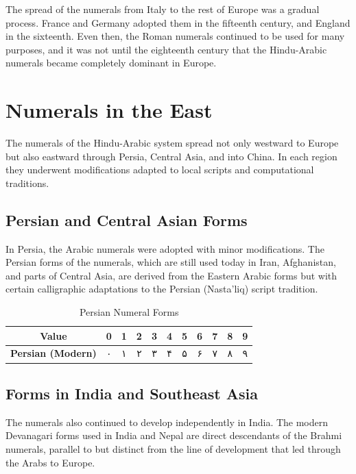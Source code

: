\documentclass[11pt,a4paper]{article}
\newcommand{\ar}[1]{{\arabicfont #1}}
\begin{document}
The spread of the numerals from Italy to the rest of Europe was a gradual process. France and Germany adopted them in the fifteenth century, and England in the sixteenth. Even then, the Roman numerals continued to be used for many purposes, and it was not until the eighteenth century that the Hindu-Arabic numerals became completely dominant in Europe.

\newpage

\section{Numerals in the East}\label{ch:east}

The numerals of the Hindu-Arabic system spread not only westward to Europe but also eastward through Persia, Central Asia, and into China. In each region they underwent modifications adapted to local scripts and computational traditions.

\subsection*{Persian and Central Asian Forms}

In Persia, the Arabic numerals were adopted with minor modifications. The Persian forms of the numerals, which are still used today in Iran, Afghanistan, and parts of Central Asia, are derived from the Eastern Arabic forms but with certain calligraphic adaptations to the Persian (Nasta'liq) script tradition.

\begin{table}[H]
\centering
\caption{Persian Numeral Forms}
\label{tab:persian}
\small
\begin{tabular}{>{\bfseries}c | c c c c c c c c c c}
\toprule
Value & 0 & 1 & 2 & 3 & 4 & 5 & 6 & 7 & 8 & 9 \\
\midrule
Persian (Modern) & \ar{۰} & \ar{۱} & \ar{۲} & \ar{۳} & \ar{۴} & \ar{۵} & \ar{۶} & \ar{۷} & \ar{۸} & \ar{۹} \\
\bottomrule
\end{tabular}
\end{table}

\subsection*{Forms in India and Southeast Asia}

The numerals also continued to develop independently in India. The modern Devanagari forms used in India and Nepal are direct descendants of the Brahmi numerals, parallel to but distinct from the line of development that led through the Arabs to Europe.
\end{document}
